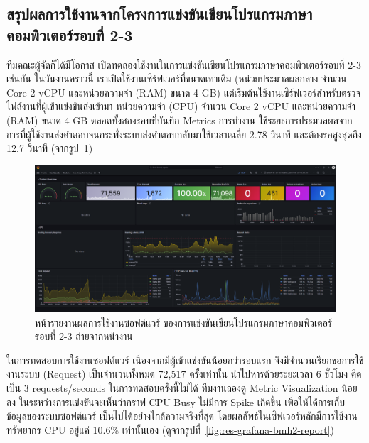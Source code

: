 \documentclass[12pt,one side,openright,a4paper]{cpe-thesis-th}
\newcommand{\thaijustify}[1]{%
  \par\hspace{30pt}\justifying
  #1
}
\begin{document}
    \subsection{สรุปผลการใช้งานจากโครงการแข่งขันเขียนโปรแกรมภาษาคอมพิวเตอร์รอบที่ 2-3}
        \thaijustify{ 
              ทีมคณะผู้จัดก็ได้มีโอกาส เปิดทดลองใช้งานในการแข่งขันเขียนโปรแกรมภาษาคอมพิวเตอร์รอบที่ 2-3 เช่นกัน ในวันงานคราวนี้ เราเปิดใช้งานเซิร์ฟเวอร์ที่ขนาดเท่าเดิม (หน่วยประมวลผลกลาง จำนวน Core 2 vCPU และหน่วยความจำ (RAM) ขนาด 4 GB) แต่เริ่มต้นใช้งานเซิร์ฟเวอร์สำหรับตรวจไฟล์งานที่ผู้เข้าแข่งขันส่งเข้ามา หน่วยความจำ (CPU) จำนวน Core 2 vCPU และหน่วยความจำ (RAM) ขนาด 4 GB ตลอดทั้งสองรอบที่บันทึก Metrics การทำงาน ใช้ระยะการประมวลผลจากการที่ผู้ใช้งานส่งคำตอบจนกระทั่งระบบส่งคำตอบกลับมาใช้เวลาเฉลี่ย 2.78 วินาที และต้องรอสูงสุดถึง 12.7 วินาที (จากรูป~\ref{fig:res-grafana-bmh2})
        }
        \begin{figure}[H]
            \centering
            \includegraphics[width=12cm]{figure/results/grafana/grafana-bmh2-raw.png}
            \caption[หน้ารายงานผลการใช้งานซอฟต์แวร์ ของการแข่งขันเขียนโปรแกรมภาษาคอมพิวเตอร์รอบที่ 2-3 ถ่ายจากหน้างาน]{หน้ารายงานผลการใช้งานซอฟต์แวร์ ของการแข่งขันเขียนโปรแกรมภาษาคอมพิวเตอร์รอบที่ 2-3 ถ่ายจากหน้างาน}
            \label{fig:res-grafana-bmh2}
        \end{figure}
        \thaijustify{
            ในการทดสอบการใช้งานซอฟต์แวร์ เนื่องจากมีผู้เข้าแข่งขันน้อยกว่ารอบแรก จึงมีจำนวนเรียกขอการใช้งานระบบ (Request) เป็นจำนวนทั้งหมด 72,517 ครั้งเท่านั้น นำไปหารด้วยระยะเวลา 6 ชั่วโมง คิดเป็น 3 requests/seconds ในการทดสอบครั้งนี้ไม่ได้ ทีมงานลองดู Metric Visualization น้อยลง ในระหว่างการแข่งขันจะเห็นว่ากราฟ CPU Busy ไม่มีการ Spike เกิดขึ้น เพื่อให้ได้การเก็บข้อมูลของระบบซอฟต์แวร์ เป็นไปได้อย่างใกล้ความจริงที่สุด โดยผลลัพธ์ในเซิฟเวอร์หลักมีการใช้งานทรัพยากร CPU อยู่แค่ 10.6\% เท่านั้นเอง (ดูจากรูปที่~\ref{fig:res-grafana-bmh2-report})
        }
\end{document}
